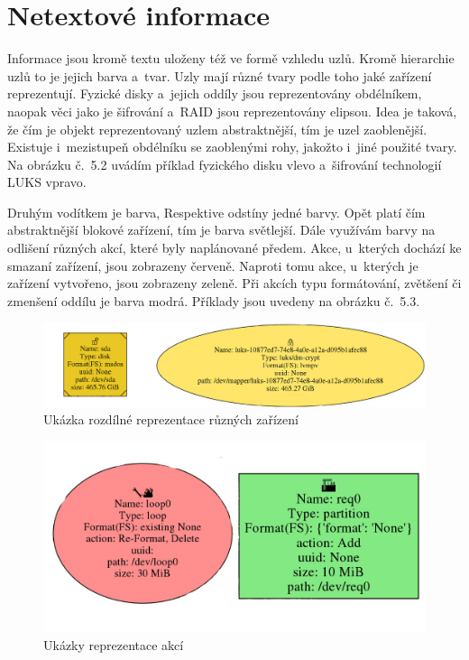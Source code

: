 \documentclass[color,table,oneside,nolot,nolof]{fithesis}
\begin{document}
\section{Netextové informace}
  Informace jsou kromě textu uloženy též ve formě vzhledu uzlů. Kromě hierarchie uzlů to je jejich barva a~tvar. Uzly mají různé tvary podle toho
	jaké zařízení reprezentují. Fyzické disky a~jejich oddíly jsou reprezentovány obdélníkem, naopak věci jako je šifrování a~RAID jsou reprezentovány
	elipsou. Idea je taková, že čím je objekt reprezentovaný uzlem abstraktnější, tím je uzel zaoblenější. Existuje i~mezistupeň obdélníku se zaoblenými
	rohy, jakožto i~jiné použité tvary. Na obrázku č.~5.2 uvádím příklad fyzického disku vlevo a~šifrování technologií LUKS vpravo.

	Druhým vodítkem je barva, Respektive odstíny jedné barvy. Opět platí čím abstraktnější blokové zařízení, tím je barva světlejší. Dále využívám
	barvy na odlišení různých akcí, které byly naplánované předem. Akce, u~kterých dochází ke smazaní zařízení, jsou zobrazeny červeně. Naproti tomu akce,
	u~kterých je zařízení vytvořeno, jsou zobrazeny zeleně. Při akcích typu formátování, zvětšení či zmenšení oddílu je barva modrá. Příklady jsou uvedeny na obrázku č.~5.3.

\begin{figure}
	\label{fig:Rozdíly zařízení}
	\caption{Ukázka rozdílné reprezentace různých zařízení}
	\centering
	\includegraphics[width=.9\columnwidth]{pictures/disk_and_luks.jpg}
\end{figure}
\begin{figure}
	\label{fig:Reprezentace naplánované akce}
	\caption{Ukázky reprezentace akcí}
	\centering
	\includegraphics[width=.9\columnwidth]{pictures/actions.jpg}
\end{figure}
  
\end{document}
